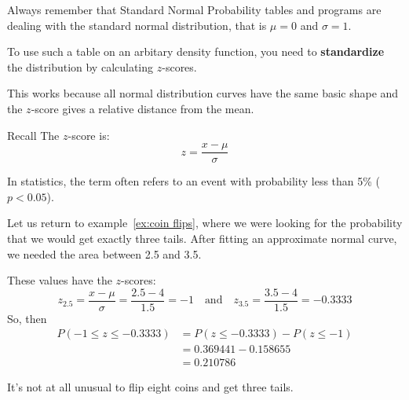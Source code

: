 \documentclass{beamer}
\newcommand{\prob}[1]{P\left(#1\right)}
\begin{document}
\begin{frame}
\begin{note}
Always remember that Standard Normal Probability tables and programs are dealing with the standard normal distribution, that is $\mu=0$ and $\sigma=1$.\pause

\vspace{2mm}
To use such a table on an arbitary density function, you need to \textbf{standardize} the distribution by calculating $z$-scores.\pause

\vspace{2mm}
This works because all normal distribution curves have the same basic shape and the $z$-score gives a relative distance from the mean.
\end{note}\pause

\begin{block}{Recall}
The $z$-score is:
\begin{equation*}
z=\dfrac{x-\mu}{\sigma}
\end{equation*}
\end{block}\pause
\begin{note}
In statistics, the term  often refers to an event with probability less than 5\% ($p<0.05$).
\end{note}
\end{frame}

\begin{frame}
\begin{example}
Let us return to example~\ref{ex:coin flips}, where we were looking for the probability that we would get exactly three tails. After fitting an approximate normal curve, we needed the area between 2.5 and 3.5.\pause 

\vspace{2mm}
These values have the $z$-scores:
\begin{equation*}
z_{2.5} = \dfrac{x-\mu}{\sigma} = \dfrac{2.5-4}{1.5} = -1
\quad\text{and}\quad
z_{3.5} = \dfrac{3.5-4}{1.5} = -0.3333
\end{equation*}\pause
So, then
\begin{equation*}
\begin{aligned}
\prob{-1\leq z\leq -0.3333} &= \prob{z\leq -0.3333} - \prob{z\leq -1} \\
&= 0.369441-0.158655 \\
&=0.210786
\end{aligned}
\end{equation*}
\end{example}\pause

\begin{note}
It's not at all unusual to flip eight coins and get three tails.
\end{note}
\end{frame}
\end{document}

